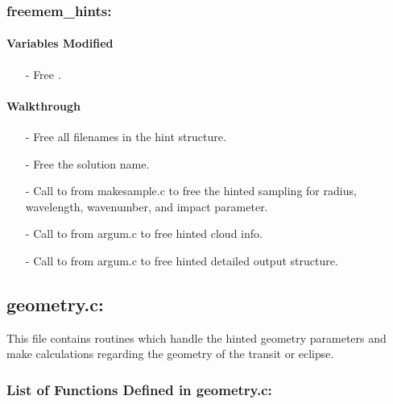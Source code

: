 \documentclass[letterpaper,12pt]{article}
\begin{document}
\subsubsection{freemem\_hints:}
\paragraph{Variables Modified}
\begin{enumerate}[leftmargin=10pt, noitemsep, parsep=0pt, topsep=0ex]
\item[-] Free .
\end{enumerate}

\paragraph{Walkthrough}
\begin{enumerate}[leftmargin=10pt, noitemsep, parsep=0pt, topsep=0ex]
\item[-] Free all filenames in the hint structure.
\item[-] Free the solution name.
\item[-] Call to  from makesample.c to free the hinted sampling for radius, wavelength, wavenumber, and impact parameter.
\item[-] Call to  from argum.c to free hinted cloud info.
\item[-] Call to  from argum.c to free hinted detailed output structure.
\end{enumerate}

\newpage
\subsection{geometry.c:}
This file contains routines which handle the hinted geometry parameters and make calculations regarding the geometry of the transit or eclipse.
\subsubsection{List of Functions Defined in geometry.c:}
 \newline
\end{document}
